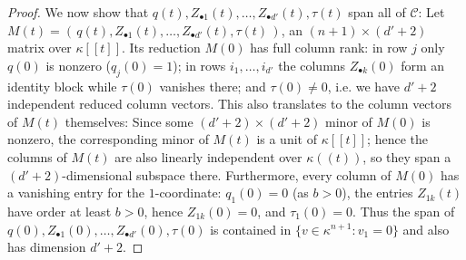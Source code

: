 \documentclass[pdflatex,sn-mathphys-num]{sn-jnl}
\numberwithin{equation}{section}
\theoremstyle{thmstyleone}
\theoremstyle{thmstyletwo}
\begin{document}
\begin{proof}
We now show that $q(t), Z_{\bullet1}(t),\dots, Z_{\bullet {d'}}(t), \tau(t)$ span all of $\mathcal C$: 
Let $M(t)=(\,q(t), Z_{\bullet1}(t),\dots, Z_{\bullet {d'}}(t),\tau(t)\,)$, an
$(n+1)\times({d'}+2)$ matrix over $\kappa[[t]]$. Its reduction $M(0)$ has full
column rank: in row $j$ only $q(0)$ is nonzero ($q_j(0)=1$); in rows $i_1,\dots,i_{d'}$
the columns $Z_{\bullet k}(0)$ form an identity block while $\tau(0)$ vanishes
there; and $\tau(0)\neq0$, i.e. we have ${d'}+2$ independent reduced column vectors. This also translates to the column vectors of $M(t)$ themselves: Since some $({d'}+2)\times({d'}+2)$ minor of $M(0)$ is nonzero, the corresponding
minor of $M(t)$ is a unit of $\kappa[[t]]$; hence the columns of $M(t)$ are also
linearly independent over $\kappa((t))$, so they span a $({d'}+2)$-dimensional
subspace there.
Furthermore, every column of $M(0)$ has a vanishing entry for the $1$-coordinate:
$q_1(0)=0$ (as $b>0$), the entries $Z_{1k}(t)$ have order at least $b>0$, hence $Z_{1k}(0) = 0$, and
$\tau_1(0)=0$. Thus the span of $q(0), Z_{\bullet1}(0),\dots, Z_{\bullet {d'}}(0), \tau(0)$ is contained in $ \{v \in \kappa^{n+1} : v_1 = 0\}$ and also has dimension ${d'}+2$. 


\end{proof}
\end{document}
